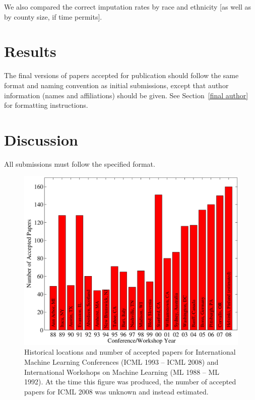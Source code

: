 \documentclass{article}
\begin{document}
We also compared the correct imputation rates by race and ethnicity [as well as by county size, if time permits].


\section{Results}

The final versions of papers accepted for publication should follow the
same format and naming convention as initial submissions, except that
author information (names and affiliations) should be given. See
Section~\ref{final author} for formatting instructions.

\section{Discussion}

All submissions must follow the specified format.

\begin{figure}[ht]
\vskip 0.2in
\begin{center}
\centerline{\includegraphics[width=\columnwidth]{icml_numpapers}}
\caption{Historical locations and number of accepted papers for International
Machine Learning Conferences (ICML 1993 -- ICML 2008) and International
Workshops on Machine Learning (ML 1988 -- ML 1992). At the time this figure was
produced, the number of accepted papers for ICML 2008 was unknown and instead
estimated.}
\label{icml-historical}
\end{center}
\vskip -0.2in
\end{figure}
\end{document}
